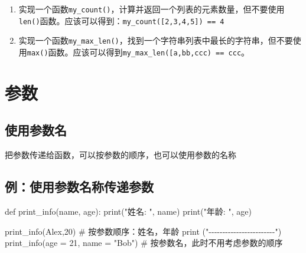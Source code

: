 \documentclass[
  letterpaper,
  DIV=11,
  numbers=noendperiod]{scrreprt}
\newenvironment{Shaded}{\begin{snugshade}}{\end{snugshade}}
\newcommand{\BuiltInTok}[1]{\textcolor[rgb]{0.00,0.23,0.31}{#1}}
\newcommand{\CommentTok}[1]{\textcolor[rgb]{0.37,0.37,0.37}{#1}}
\newcommand{\DecValTok}[1]{\textcolor[rgb]{0.68,0.00,0.00}{#1}}
\newcommand{\KeywordTok}[1]{\textcolor[rgb]{0.00,0.23,0.31}{#1}}
\newcommand{\NormalTok}[1]{\textcolor[rgb]{0.00,0.23,0.31}{#1}}
\newcommand{\OperatorTok}[1]{\textcolor[rgb]{0.37,0.37,0.37}{#1}}
\newcommand{\StringTok}[1]{\textcolor[rgb]{0.13,0.47,0.30}{#1}}
\begin{document}
\begin{enumerate}
\def\labelenumi{\arabic{enumi}.}
\item
  实现一个函数\texttt{my\_count()}，计算并返回一个列表的元素数量，但不要使用\texttt{len()}函数。应该可以得到：\texttt{my\_count({[}2,3,4,5{]})\ ==\ 4}
\item
  实现一个函数\texttt{my\_max\_len()}，找到一个字符串列表中最长的字符串，但不要使用\texttt{max()}函数。应该可以得到\texttt{my\_max\_len({[}\textquotesingle{}a\textquotesingle{},\textquotesingle{}bb\textquotesingle{},\textquotesingle{}ccc\textquotesingle{}{]})\ ==\ \textquotesingle{}ccc\textquotesingle{}}。
\end{enumerate}

\hypertarget{ux53c2ux6570}{%
\section{参数}\label{ux53c2ux6570}}

\hypertarget{ux4f7fux7528ux53c2ux6570ux540d}{%
\subsection{使用参数名}\label{ux4f7fux7528ux53c2ux6570ux540d}}

把参数传递给函数，可以按参数的顺序，也可以使用参数的名称

\hypertarget{ux4f8bux4f7fux7528ux53c2ux6570ux540dux79f0ux4f20ux9012ux53c2ux6570}{%
\subsection{例：使用参数名称传递参数}\label{ux4f8bux4f7fux7528ux53c2ux6570ux540dux79f0ux4f20ux9012ux53c2ux6570}}

\begin{Shaded}
\begin{Highlighting}[]
\KeywordTok{def}\NormalTok{ print\_info(name, age):}
    \BuiltInTok{print}\NormalTok{(}\StringTok{"姓名: "}\NormalTok{, name)}
    \BuiltInTok{print}\NormalTok{(}\StringTok{"年龄: "}\NormalTok{, age)}

\NormalTok{print\_info(}\StringTok{\textquotesingle{}Alex\textquotesingle{}}\NormalTok{,}\DecValTok{20}\NormalTok{) }\CommentTok{\# 按参数顺序：姓名，年龄}
\BuiltInTok{print}\NormalTok{ (}\StringTok{"{-}{-}{-}{-}{-}{-}{-}{-}{-}{-}{-}{-}{-}{-}{-}{-}{-}{-}{-}{-}{-}{-}{-}{-}"}\NormalTok{)}
\NormalTok{print\_info(age }\OperatorTok{=} \DecValTok{21}\NormalTok{, name }\OperatorTok{=} \StringTok{"Bob"}\NormalTok{) }\CommentTok{\# 按参数名，此时不用考虑参数的顺序}
\end{Highlighting}
\end{Shaded}
\end{document}
